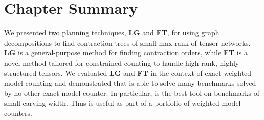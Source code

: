 \section{Chapter Summary} \label{sec:tensors:conclusion}
We presented two planning techniques, \textbf{LG} and \textbf{FT}, for using graph decompositions to find contraction trees of small max rank of tensor networks. \textbf{LG} is a general-purpose method for finding contraction orders, while \textbf{FT} is a novel method tailored for constrained counting to handle high-rank, highly-structured tensors. We evaluated \textbf{LG} and \textbf{FT} in the context of exact weighted model counting and demonstrated that  is able to solve many benchmarks solved by no other exact model counter. In particular,  is the best tool on benchmarks of small carving width. Thus  is useful as part of a portfolio of weighted model counters. 





